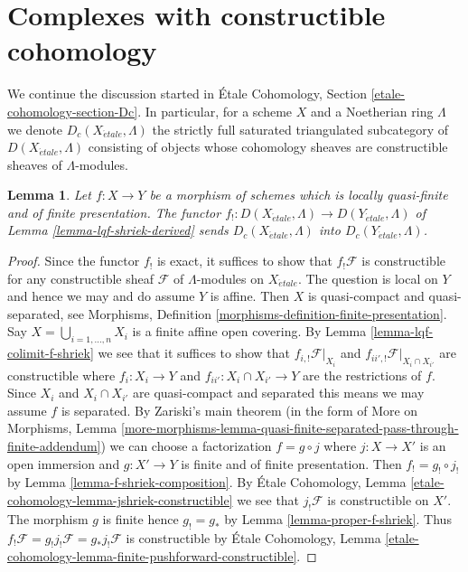 \documentclass{stacks-project}
\theoremstyle{plain}
\newtheorem{lemma}[subsection]{Lemma}
\theoremstyle{definition}
\theoremstyle{remark}
\numberwithin{equation}{subsection}
\def\etale{{\acute{e}tale}}
\begin{document}
\section{Complexes with constructible cohomology}
\label{section-Dc}

\noindent
We continue the discussion started in \'Etale Cohomology, Section
\ref{etale-cohomology-section-Dc}. In particular, for a scheme
$X$ and a Noetherian ring $\Lambda$ we denote
$D_c(X_\etale, \Lambda)$ the strictly full saturated triangulated
subcategory of $D(X_\etale, \Lambda)$ consisting of objects
whose cohomology sheaves are constructible sheaves of $\Lambda$-modules.

\begin{lemma}
\label{lemma-qf-f-shriek-constructible}
Let $f : X \to Y$ be a morphism of schemes which is
locally quasi-finite and of finite presentation.
The functor $f_! : D(X_\etale, \Lambda) \to D(Y_\etale, \Lambda)$
of Lemma \ref{lemma-lqf-shriek-derived}
sends $D_c(X_\etale, \Lambda)$ into $D_c(Y_\etale, \Lambda)$.
\end{lemma}

\begin{proof}
Since the functor $f_!$ is exact, it suffices to show that
$f_!\mathcal{F}$ is constructible for any constructible sheaf
$\mathcal{F}$ of $\Lambda$-modules on $X_\etale$.
The question is local on $Y$ and hence
we may and do assume $Y$ is affine.
Then $X$ is quasi-compact and quasi-separated, see
Morphisms, Definition \ref{morphisms-definition-finite-presentation}.
Say $X = \bigcup_{i = 1, \ldots, n} X_i$ is a finite affine open
covering. By Lemma \ref{lemma-lqf-colimit-f-shriek}
we see that it suffices to show that
$f_{i, !}\mathcal{F}|_{X_i}$ and $f_{ii', !}\mathcal{F}|_{X_i \cap X_{i'}}$
are constructible where $f_i : X_i \to Y$ and
$f_{ii'} : X_i \cap X_{i'} \to Y$ are the restrictions of $f$.
Since $X_i$ and $X_i \cap X_{i'}$ are quasi-compact and separated
this means we may assume $f$ is separated.
By Zariski's main theorem (in the form of
More on Morphisms, Lemma
\ref{more-morphisms-lemma-quasi-finite-separated-pass-through-finite-addendum})
we can choose a factorization $f = g \circ j$ where
$j : X \to X'$ is an open immersion and $g : X' \to Y$ is
finite and of finite presentation. Then $f_! = g_! \circ j_!$ by
Lemma \ref{lemma-f-shriek-composition}.
By \'Etale Cohomology, Lemma \ref{etale-cohomology-lemma-jshriek-constructible}
we see that $j_!\mathcal{F}$ is constructible on $X'$.
The morphism $g$ is finite hence $g_! = g_*$
by Lemma \ref{lemma-proper-f-shriek}.
Thus $f_!\mathcal{F} = g_!j_!\mathcal{F} = g_*j_!\mathcal{F}$
is constructible by
\'Etale Cohomology, Lemma
\ref{etale-cohomology-lemma-finite-pushforward-constructible}.
\end{proof}
\end{document}
